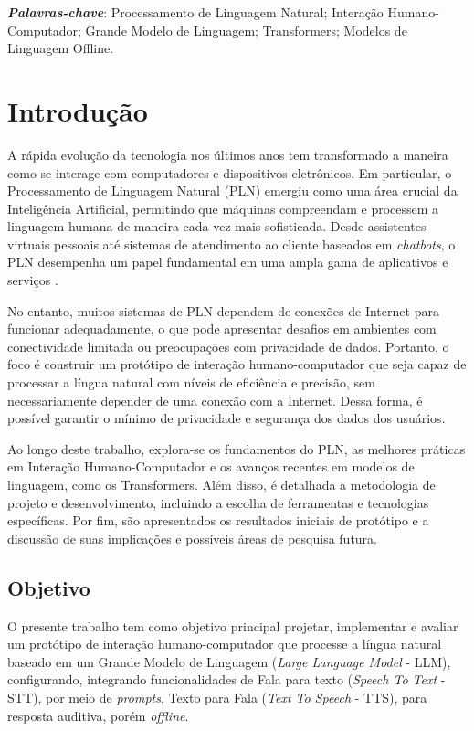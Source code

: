 \documentclass[10pt, conference, compsocconf]{IEEEtran}
\begin{document}
\textbf{\textit{Palavras-chave}}: Processamento de Linguagem Natural; Interação Humano-Computador; Grande Modelo de Linguagem; Transformers; Modelos de Linguagem Offline.

\IEEEpeerreviewmaketitle

\section{Introdução}

A rápida evolução da tecnologia nos últimos anos tem transformado a maneira como se interage com computadores e dispositivos eletrônicos. Em particular, o Processamento de Linguagem Natural (PLN) emergiu como uma área crucial da Inteligência Artificial, permitindo que máquinas compreendam e processem a linguagem humana de maneira cada vez mais sofisticada. Desde assistentes virtuais pessoais até sistemas de atendimento ao cliente baseados em \textit{chatbots}, o PLN desempenha um papel fundamental em uma ampla gama de aplicativos e serviços \cite{jurafsky2000speech,hapke2019natural}.

No entanto, muitos sistemas de PLN dependem de conexões de Internet para funcionar adequadamente, o que pode apresentar desafios em ambientes com conectividade limitada ou preocupações com privacidade de dados. Portanto, o foco é construir um protótipo de interação humano-computador que seja capaz de processar a língua natural com níveis de  eficiência e precisão, sem necessariamente depender de uma conexão com a Internet. Dessa forma, é possível garantir o mínimo de privacidade e segurança dos dados dos usuários.

Ao longo deste trabalho, explora-se os fundamentos do PLN, as melhores práticas em Interação Humano-Computador e os avanços recentes em modelos de linguagem, como os Transformers. Além disso, é detalhada a metodologia de projeto e desenvolvimento, incluindo a escolha de ferramentas e tecnologias específicas. Por fim, são apresentados os resultados iniciais de protótipo e a discussão de suas implicações e possíveis áreas de pesquisa futura.


\subsection{Objetivo}
O presente trabalho tem como objetivo principal projetar, implementar e avaliar um protótipo de interação humano-computador que processe a língua natural baseado em um Grande Modelo de Linguagem (\textit{Large Language Model} - LLM), configurando, integrando funcionalidades de Fala para texto (\textit{Speech To Text} - STT), por meio de \textit{prompts}, Texto para Fala (\textit{Text To Speech} - TTS), para resposta auditiva, porém  \textit{offline}.
\end{document}
